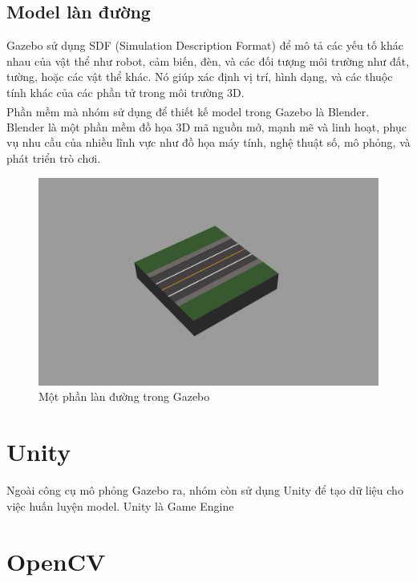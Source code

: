 \subsection{Model làn đường}
\tab Gazebo sử dụng SDF (Simulation Description Format) để mô tả các yếu tố khác nhau của vật thể như robot, cảm biến, đèn, và các đối tượng môi trường như đất, tường, hoặc các vật thể khác. Nó giúp xác định vị trí, hình dạng, và các thuộc tính khác của các phần tử trong môi trường 3D.\\
\tab Phần mềm mà nhóm sử dụng để thiết kế model trong Gazebo là Blender\textsuperscript{\cite{blender}}. Blender là một phần mềm đồ họa 3D mã nguồn mở, mạnh mẽ và linh hoạt, phục vụ nhu cầu của nhiều lĩnh vực như đồ họa máy tính, nghệ thuật số, mô phỏng, và phát triển trò chơi.
\begin{figure}[!htb]
\begin{center}
    \includegraphics[width=12cm]{img/2_Theory/lane_model.png}
    \caption{Một phần làn đường trong Gazebo}
\end{center}
\end{figure}
\newpage
\section{Unity}
Ngoài công cụ mô phỏng Gazebo ra, nhóm còn sử dụng Unity để tạo dữ liệu cho việc huấn luyện model. Unity là Game Engine
\newpage
\section{OpenCV}
